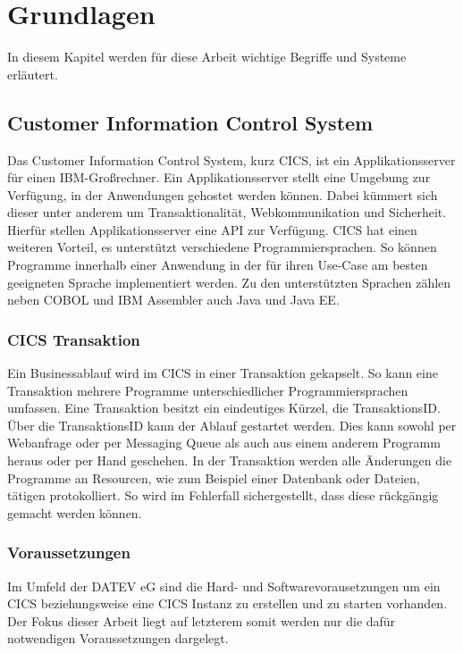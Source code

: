 \chapter{Grundlagen}\label{ch:grundlagen}
In diesem Kapitel werden für diese Arbeit wichtige Begriffe und Systeme erläutert.

\section{Customer Information Control System}\label{cics}
Das Customer Information Control System, kurz CICS, ist ein Applikationsserver für einen IBM-Großrechner.
Ein Applikationsserver stellt eine Umgebung zur Verfügung, in der Anwendungen gehostet werden können.
Dabei kümmert sich dieser unter anderem um Transaktionalität, Webkommunikation und Sicherheit.
Hierfür stellen Applikationsserver eine API zur Verfügung.
CICS hat einen weiteren Vorteil, es unterstützt verschiedene Programmiersprachen.
So können Programme innerhalb einer Anwendung in der für ihren Use-Case am besten geeigneten Sprache implementiert werden.
Zu den unterstützten Sprachen zählen neben COBOL und IBM Assembler auch Java und Java EE.
\cite{Rayns.2011}

\subsection{CICS Transaktion}\label{subsec:trans}
Ein Businessablauf wird im CICS in einer Transaktion gekapselt.
So kann eine Transaktion mehrere Programme unterschiedlicher Programmiersprachen umfassen.
Eine Transaktion besitzt ein eindeutiges Kürzel, die TransaktionsID.
Über die TransaktionsID kann der Ablauf gestartet werden.
Dies kann sowohl per Webanfrage oder per Messaging Queue als auch aus einem anderem Programm heraus oder per Hand geschehen.
In der Transaktion werden alle Änderungen die Programme an Resourcen, wie zum Beispiel einer Datenbank oder Dateien, tätigen protokolliert.
So wird im Fehlerfall sichergestellt, dass diese rückgängig gemacht werden können.
 \cite{Rayns.2011}

\subsection{Voraussetzungen}\label{subsec:voraus}
Im Umfeld der DATEV eG sind die Hard- und Softwarevorausetzungen um ein CICS beziehungsweise eine CICS Instanz zu erstellen und zu starten vorhanden.
Der Fokus dieser Arbeit liegt auf letzterem somit werden nur die dafür notwendigen Voraussetzungen dargelegt.

